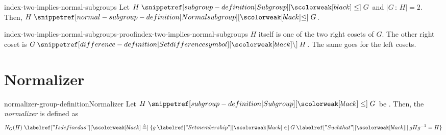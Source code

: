 \documentclass[preview]{standalone}
\begin{document}



\begin{snippetcorollary}{index-two-implies-normal-subgroups}{}
    Let \(H \subgroupleq G\) and \(|G \,:\, H| = 2\).
    Then, \(H \normalsubgrp G\).
\end{snippetcorollary}

\begin{snippetproof}{index-two-implies-normal-subgroups-proof}{index-two-implies-normal-subgroups}{}
    \(H\) itself is one of the two right cosets of \(G\).
    The other right coset is \(G \difference H\).
    The same goes for the left cosets.
\end{snippetproof}

\section{Normalizer}

\begin{snippetdefinition}{normalizer-group-definition}{Normalizer}
    Let \(H \subgroupleq G\) be \group[groups]. Then, the \emph{normalizer}
    is defined as
    \[
        N_G(H) \triangleq
        \{g\in G \suchthat gHg^{-1} = H\}
    \]
\end{snippetdefinition}
\end{document}
